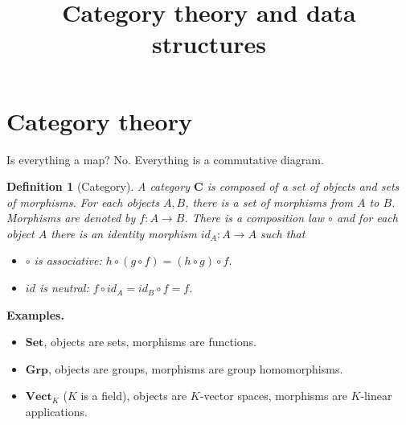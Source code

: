 \documentclass[11pt,a4paper]{article}
\title{Category theory and data structures}
\newtheorem{defi}[theo]{Definition}
\newcommand{\itemz}{\item[$\triangleright$]}
\newcommand{\gr}{\textbf}
\newcommand{\1}{\mathbbm{1}}
\begin{document}
\section{Category theory}
Is everything a map? No. Everything is a commutative diagram.
\begin{defi}[Category]
A category $\gr{C}$ is composed of a set of objects and sets of morphisms. For each objects $A,B$, there is a set of morphisms from $A$ to $B$. Morphisms are denoted by $f : A \to B$. There is a composition law $\circ$ and for each object $A$ there is an identity morphism $id_A : A \to A$ such that
\begin{itemize}
\setlength\itemsep{-0.3em}
\itemz $\circ$ is associative: $h \circ (g \circ f) = (h \circ g) \circ f$.
\itemz $id$ is neutral: $f \circ id_A = id_B \circ f = f$.
\end{itemize}
\end{defi}

\begin{center}
\end{center}

\gr{Examples.}
\begin{itemize}
\setlength\itemsep{-0.3em}
\itemz $\gr{Set}$, objects are sets, morphisms are functions.
\itemz $\gr{Grp}$, objects are groups, morphisms are group homomorphisms.
\itemz $\gr{Vect}_K$ ($K$ is a field), objects are $K$-vector spaces, morphisms are $K$-linear applications.
\end{itemize}
\end{document}
